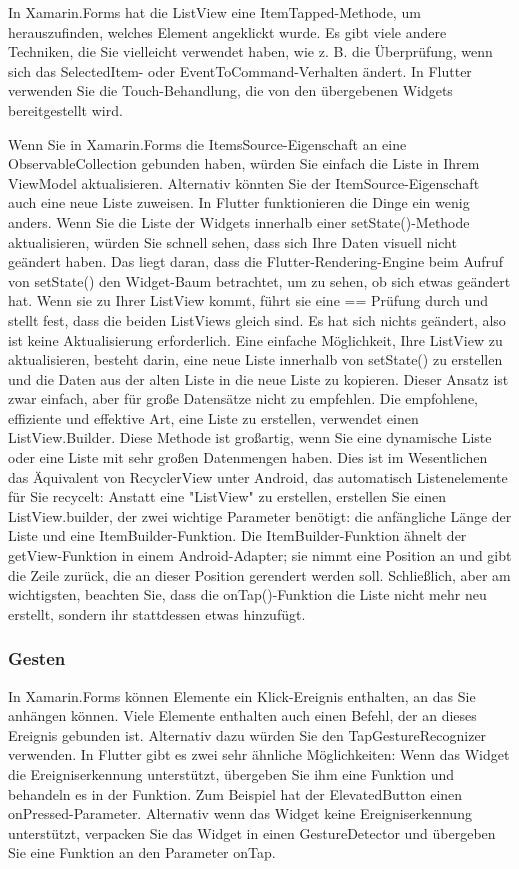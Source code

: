 In Xamarin.Forms hat die ListView eine ItemTapped-Methode, um herauszufinden, welches Element angeklickt wurde. Es gibt viele andere Techniken, die Sie vielleicht verwendet haben, wie z. B. die Überprüfung, wenn sich das SelectedItem- oder EventToCommand-Verhalten ändert. In Flutter verwenden Sie die Touch-Behandlung, die von den übergebenen Widgets bereitgestellt wird.

Wenn Sie in Xamarin.Forms die ItemsSource-Eigenschaft an eine ObservableCollection gebunden haben, würden Sie einfach die Liste in Ihrem ViewModel aktualisieren. Alternativ könnten Sie der ItemSource-Eigenschaft auch eine neue Liste zuweisen. In Flutter funktionieren die Dinge ein wenig anders. Wenn Sie die Liste der Widgets innerhalb einer setState()-Methode aktualisieren, würden Sie schnell sehen, dass sich Ihre Daten visuell nicht geändert haben. Das liegt daran, dass die Flutter-Rendering-Engine beim Aufruf von setState() den Widget-Baum betrachtet, um zu sehen, ob sich etwas geändert hat. Wenn sie zu Ihrer ListView kommt, führt sie eine == Prüfung durch und stellt fest, dass die beiden ListViews gleich sind. Es hat sich nichts geändert, also ist keine Aktualisierung erforderlich. Eine einfache Möglichkeit, Ihre ListView zu aktualisieren, besteht darin, eine neue Liste innerhalb von setState() zu erstellen und die Daten aus der alten Liste in die neue Liste zu kopieren. Dieser Ansatz ist zwar einfach, aber für große Datensätze nicht zu empfehlen. Die empfohlene, effiziente und effektive Art, eine Liste zu erstellen, verwendet einen ListView.Builder. Diese Methode ist großartig, wenn Sie eine dynamische Liste oder eine Liste mit sehr großen Datenmengen haben. Dies ist im Wesentlichen das Äquivalent von RecyclerView unter Android, das automatisch Listenelemente für Sie recycelt:
Anstatt eine "ListView" zu erstellen, erstellen Sie einen ListView.builder, der zwei wichtige Parameter benötigt: die anfängliche Länge der Liste und eine ItemBuilder-Funktion. Die ItemBuilder-Funktion ähnelt der getView-Funktion in einem Android-Adapter; sie nimmt eine Position an und gibt die Zeile zurück, die an dieser Position gerendert werden soll. Schließlich, aber am wichtigsten, beachten Sie, dass die onTap()-Funktion die Liste nicht mehr neu erstellt, sondern ihr stattdessen etwas hinzufügt.



\subsubsection{Gesten}
In Xamarin.Forms können Elemente ein Klick-Ereignis enthalten, an das Sie anhängen können. Viele Elemente enthalten auch einen Befehl, der an dieses Ereignis gebunden ist. Alternativ dazu würden Sie den TapGestureRecognizer verwenden. In Flutter gibt es zwei sehr ähnliche Möglichkeiten: Wenn das Widget die Ereigniserkennung unterstützt, übergeben Sie ihm eine Funktion und behandeln es in der Funktion. Zum Beispiel hat der ElevatedButton einen onPressed-Parameter. Alternativ wenn das Widget keine Ereigniserkennung unterstützt, verpacken Sie das Widget in einen GestureDetector und übergeben Sie eine Funktion an den Parameter onTap.

